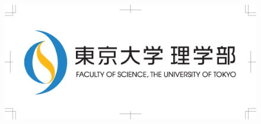 \documentclass[12pt, a4j, dvipdfmx, sffamily]{jsarticle}
\begin{document}
\begin{figure}[H]
\centering
\includegraphics[width=0.7\linewidth, trim = 50 50 50 50, clip]{test.eps}
\end{figure}
\end{document}
